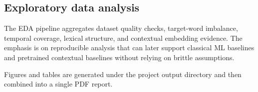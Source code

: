 \subsection{Exploratory data analysis}
The EDA pipeline aggregates dataset quality checks, target-word imbalance, temporal coverage, lexical structure, and contextual embedding evidence. The emphasis is on reproducible analysis that can later support classical ML baselines and pretrained contextual baselines without relying on brittle assumptions.

Figures and tables are generated under the project output directory and then combined into a single PDF report.
